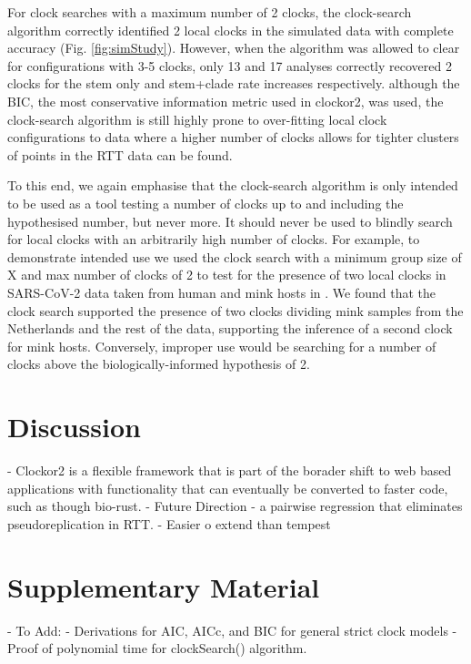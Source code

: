 \documentclass{article}
\begin{document}
For clock searches with a maximum number of 2 clocks, the clock-search algorithm correctly identified 2 local clocks in the simulated data with complete accuracy (Fig. \ref{fig:simStudy}). However, when the algorithm was allowed to clear for configurations with 3-5 clocks, only 13 and 17 analyses correctly recovered 2 clocks for the stem only and stem+clade rate increases respectively. although the BIC, the most conservative information metric used in clockor2, was used, the clock-search algorithm is still highly prone to over-fitting local clock configurations to data where a higher number of clocks allows for tighter clusters of points in the RTT data can be found.

To this end, we again emphasise that the clock-search algorithm is only intended to be used as a tool testing a number of clocks up to and including the hypothesised number, but never more. It should never be used to blindly search for local clocks with an arbitrarily high number of clocks. For example, to demonstrate intended use we used the clock search with a minimum group size of X and max number of clocks of 2 to test for the presence of two local clocks in SARS-CoV-2 data taken from human and mink hosts in \citet{porter2023evolutionary}. We found that the clock search supported the presence of two clocks dividing mink samples from the Netherlands and the rest of the data, supporting the inference of a second clock for mink hosts. Conversely, improper use would be searching for a number of clocks above the biologically-informed hypothesis of 2.

\section*{Discussion}
- Clockor2 is a flexible framework that is part of the borader shift to web based applications with functionality that can eventually be converted to faster code, such as though bio-rust.
- Future Direction - a pairwise regression that eliminates pseudoreplication in RTT.
- Easier o extend than tempest



\section*{Supplementary Material}
- To Add:
- Derivations for AIC, AICc, and BIC for general strict clock models
- Proof of polynomial time for clockSearch() algorithm.
\end{document}
